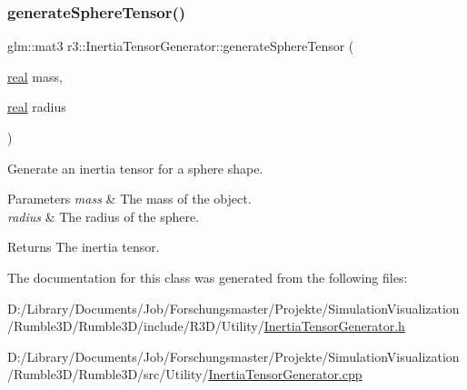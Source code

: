 \subsubsection{\texorpdfstring{generate\+Sphere\+Tensor()}{generateSphereTensor()}}
{\footnotesize\ttfamily glm\+::mat3 r3\+::\+Inertia\+Tensor\+Generator\+::generate\+Sphere\+Tensor (\begin{DoxyParamCaption}\item[{\mbox{\hyperlink{namespacer3_ab2016b3e3f743fb735afce242f0dc1eb}{real}}}]{mass,  }\item[{\mbox{\hyperlink{namespacer3_ab2016b3e3f743fb735afce242f0dc1eb}{real}}}]{radius }\end{DoxyParamCaption})\hspace{0.3cm}{\ttfamily [static]}}



Generate an inertia tensor for a sphere shape. 


\begin{DoxyParams}{Parameters}
{\em mass} & The mass of the object. \\
\hline
{\em radius} & The radius of the sphere. \\
\hline
\end{DoxyParams}
\begin{DoxyReturn}{Returns}
The inertia tensor. 
\end{DoxyReturn}


The documentation for this class was generated from the following files\+:\begin{DoxyCompactItemize}
\item 
D\+:/\+Library/\+Documents/\+Job/\+Forschungsmaster/\+Projekte/\+Simulation\+Visualization/\+Rumble3\+D/\+Rumble3\+D/include/\+R3\+D/\+Utility/\mbox{\hyperlink{_inertia_tensor_generator_8h}{Inertia\+Tensor\+Generator.\+h}}\item 
D\+:/\+Library/\+Documents/\+Job/\+Forschungsmaster/\+Projekte/\+Simulation\+Visualization/\+Rumble3\+D/\+Rumble3\+D/src/\+Utility/\mbox{\hyperlink{_inertia_tensor_generator_8cpp}{Inertia\+Tensor\+Generator.\+cpp}}\end{DoxyCompactItemize}
